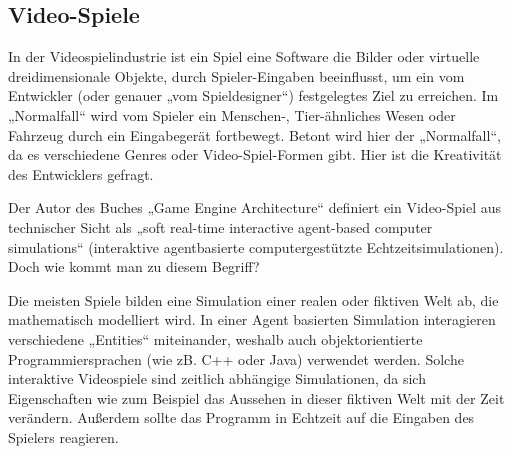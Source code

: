 \subsection{Video-Spiele}

In der Videospielindustrie ist ein Spiel eine Software die Bilder oder virtuelle dreidimensionale Objekte, durch Spieler-Eingaben beeinflusst, um ein vom Entwickler (oder genauer „vom Spieldesigner“) festgelegtes Ziel zu erreichen. 
Im „Normalfall“ wird vom Spieler ein Menschen-, Tier-ähnliches Wesen oder Fahrzeug durch ein Eingabegerät fortbewegt. Betont wird hier der „Normalfall“, da es verschiedene Genres oder Video-Spiel-Formen gibt. Hier ist die Kreativität des Entwicklers gefragt.

Der Autor des Buches „Game Engine Architecture“ \cite{gea} definiert ein Video-Spiel aus technischer Sicht als „soft real-time interactive agent-based computer simulations“ (interaktive agentbasierte computergestützte Echtzeitsimulationen).
Doch wie kommt man zu diesem Begriff?

Die meisten Spiele bilden eine Simulation einer realen oder fiktiven Welt ab, die mathematisch modelliert wird. In einer Agent basierten Simulation interagieren verschiedene „Entities“ miteinander, weshalb auch objektorientierte Programmiersprachen (wie zB. C++ oder Java) verwendet werden.
Solche interaktive Videospiele sind zeitlich abhängige Simulationen, da sich Eigenschaften wie zum Beispiel das Aussehen in dieser fiktiven Welt mit der Zeit verändern. Außerdem sollte das Programm in Echtzeit auf die Eingaben des Spielers reagieren.
